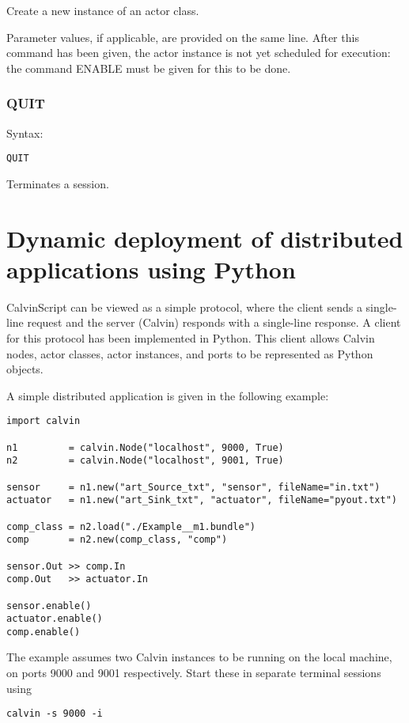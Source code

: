 \documentclass[10pt, a4paper]{article}
\begin{document}
Create a new instance of an actor class.

Parameter values, if applicable, are provided on the same line. After this command has been given, the actor instance is not yet scheduled for execution: the command ENABLE must be given for this to be done.

\subsubsection*{QUIT}

Syntax:
\begin{verbatim}
QUIT
\end{verbatim}

Terminates a session.

\section{Dynamic deployment of distributed applications using Python}

CalvinScript can be viewed as a simple protocol, where the client
sends a single-line request and the server (Calvin) responds with a
single-line response. A client for this protocol has been implemented
in Python. This client allows Calvin nodes, actor classes, actor
instances, and ports to be represented as Python objects.

A simple distributed application is given in the following example:

\begin{verbatim}
import calvin

n1         = calvin.Node("localhost", 9000, True)
n2         = calvin.Node("localhost", 9001, True)

sensor     = n1.new("art_Source_txt", "sensor", fileName="in.txt")
actuator   = n1.new("art_Sink_txt", "actuator", fileName="pyout.txt")

comp_class = n2.load("./Example__m1.bundle")
comp       = n2.new(comp_class, "comp")

sensor.Out >> comp.In
comp.Out   >> actuator.In

sensor.enable()
actuator.enable()
comp.enable()
\end{verbatim}

The example assumes two Calvin instances to be running on the local
machine, on ports 9000 and 9001 respectively. Start these in separate
terminal sessions using

\begin{verbatim}
calvin -s 9000 -i
\end{verbatim}
\end{document}
